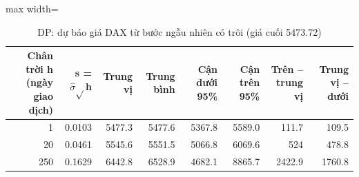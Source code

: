 \begin{table}[H]
\centering\small
\caption{DP: dự báo giá DAX từ bước ngẫu nhiên có trôi (giá cuối 5473.72)}\label{tab:tab_b12_09_dp_forecast}
\begin{adjustbox}{max width=\linewidth}
\begin{tabular}{rrrrrrrr}
\toprule
Chân trời h (ngày giao dịch) & s = $\hat{\sigma}\sqrt{}$h & Trung vị & Trung bình & Cận dưới 95\% & Cận trên 95\% & Trên – trung vị & Trung vị – dưới \\
\midrule
1 & 0.0103 & 5477.3 & 5477.6 & 5367.8 & 5589.0 & 111.7 & 109.5 \\
20 & 0.0461 & 5545.6 & 5551.5 & 5066.8 & 6069.6 & 524 & 478.8 \\
250 & 0.1629 & 6442.8 & 6528.9 & 4682.1 & 8865.7 & 2422.9 & 1760.8 \\
\bottomrule
\end{tabular}
\end{adjustbox}
\end{table}
